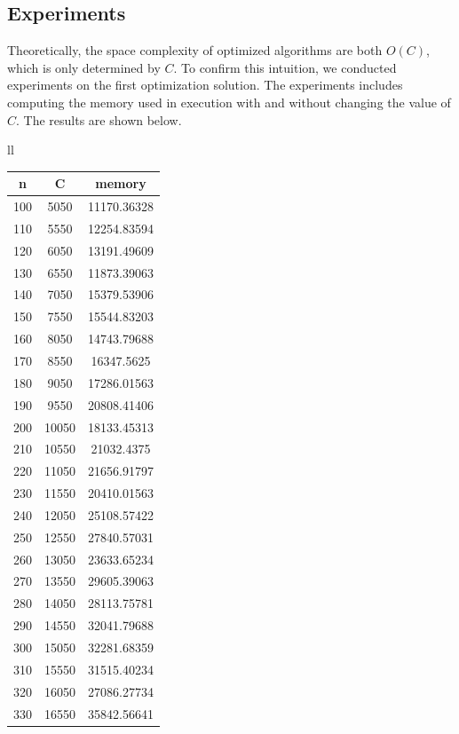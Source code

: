 \documentclass{article}
\begin{document}
\subsection{Experiments}
Theoretically, the space complexity of optimized algorithms are both $O(C)$, which is only determined by $C$. To confirm this intuition, we conducted experiments on the first optimization solution. The experiments includes computing the memory used in execution with and without changing the value of $C$. The results are shown below.
\begin{center}
    \setlength{\LTleft}{-25cm plus -1fill}
    \setlength{\LTright}{\LTleft}
    \begin{tabular}{ll}
    \begin{tabular}{|c|c|c|}
    \hline
n	&	C	&	memory	\\	\hline
100	&	5050	&	11170.36328	\\	\hline
110	&	5550	&	12254.83594	\\	\hline
120	&	6050	&	13191.49609	\\	\hline
130	&	6550	&	11873.39063	\\	\hline
140	&	7050	&	15379.53906	\\	\hline
150	&	7550	&	15544.83203	\\	\hline
160	&	8050	&	14743.79688	\\	\hline
170	&	8550	&	16347.5625	\\	\hline
180	&	9050	&	17286.01563	\\	\hline
190	&	9550	&	20808.41406	\\	\hline
200	&	10050	&	18133.45313	\\	\hline
210	&	10550	&	21032.4375	\\	\hline
220	&	11050	&	21656.91797	\\	\hline
230	&	11550	&	20410.01563	\\	\hline
240	&	12050	&	25108.57422	\\	\hline
250	&	12550	&	27840.57031	\\	\hline
260	&	13050	&	23633.65234	\\	\hline
270	&	13550	&	29605.39063	\\	\hline
280	&	14050	&	28113.75781	\\	\hline
290	&	14550	&	32041.79688	\\	\hline
300	&	15050	&	32281.68359	\\	\hline
310	&	15550	&	31515.40234	\\	\hline
320	&	16050	&	27086.27734	\\	\hline
330	&	16550	&	35842.56641	\\	\hline

\end{tabular}
\end{tabular}
\end{center}
\end{document}
